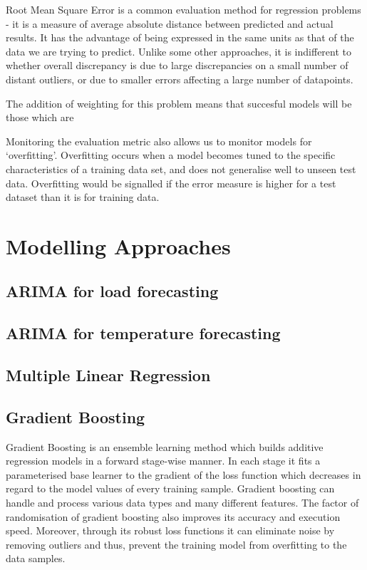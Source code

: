 \documentclass{article} %
\begin{document}
Root Mean Square Error is a common evaluation method for regression problems - it is a measure of average absolute distance between predicted and actual results.  It has the advantage of being expressed in the same units as that of the data we are trying to predict.  Unlike some other approaches, it is indifferent to whether overall discrepancy is due to large discrepancies on a small number of distant outliers, or due to smaller errors affecting a large number of datapoints.

The addition of weighting for this problem means that succesful models will be those which are 

Monitoring the evaluation metric also allows us to monitor models for `overfitting'.  Overfitting occurs when a model becomes tuned to the specific characteristics of a training data set, and does not generalise well to unseen test data. Overfitting would be signalled if the error measure is higher for a test dataset than it is for training data.

\section*{Modelling Approaches}

\subsection*{ARIMA for load forecasting}

\subsection*{ARIMA for temperature forecasting}

\subsection*{Multiple Linear Regression}

\subsection*{Gradient Boosting}
Gradient Boosting is an ensemble learning method which builds additive regression models in a forward stage-wise manner. In each stage it fits a parameterised base learner to the gradient of the loss function which decreases in regard to the model values of every training sample. Gradient boosting can handle and process various data types and many different features. The factor of randomisation of gradient boosting also improves its accuracy and execution speed. Moreover, through its robust loss functions it can eliminate noise by removing outliers and thus, prevent the training model from overfitting to the data samples.
\end{document}
